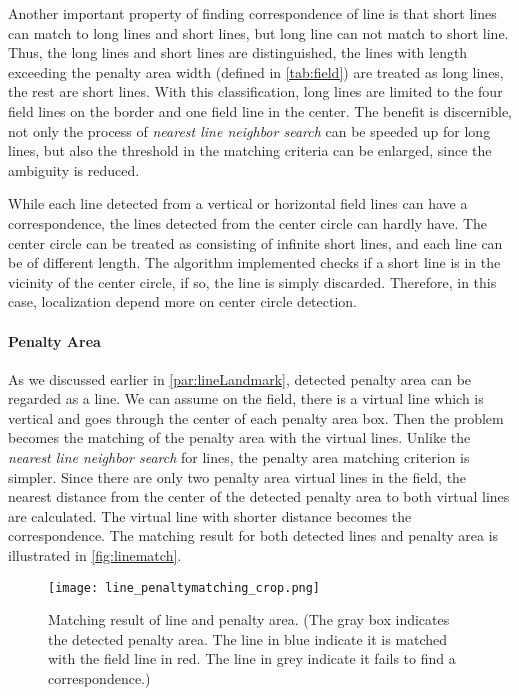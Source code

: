 Another important property of finding correspondence of line is that short lines can match to long lines and short lines, but long line can not match to short line. Thus, the long lines and short lines are distinguished, the lines with length exceeding the penalty area width (defined in \autoref{tab:field}) are treated as long lines, the rest are short lines. With this classification, long lines are limited to the four field lines on the border and one field line in the center. The benefit is discernible, not only the process of \textit{nearest line neighbor search} can be speeded up for long lines, but also the threshold in the matching criteria can be enlarged, since the ambiguity is reduced. 

While each line detected from a vertical or horizontal field lines can have a correspondence, the lines detected from the center circle can hardly have. The center circle can be treated as consisting of infinite short lines, and each line can be of different length. The algorithm implemented checks if a short line is in the vicinity of the center circle, if so, the line is simply discarded. Therefore, in this case, localization depend more on center circle detection.




\paragraph{Penalty Area}
As we discussed earlier in \autoref{par:lineLandmark}, detected penalty area can be regarded as a line. We can assume on the field, there is a virtual line which is vertical and goes through the center of each penalty area box. Then the problem becomes the matching of the penalty area with the virtual lines. Unlike the \textit{nearest line neighbor search} for lines, the penalty area matching criterion is simpler. Since there are only two penalty area virtual lines in the field, the nearest distance from the center of the detected penalty area to both virtual lines are calculated. The virtual line with shorter distance becomes the correspondence. The matching result for both detected lines and penalty area is illustrated in \autoref{fig:linematch}.

\begin{figure}[h]
\begin{center}
  \texttt{[image: line\_penaltymatching\_crop.png]}
\end{center}
\caption{Matching result of line and penalty area. (The gray box indicates the detected penalty area. The line in blue indicate it is matched with the field line in red. The line in grey indicate it fails to find a correspondence.)}
\label{fig:linematch}
\end{figure}





